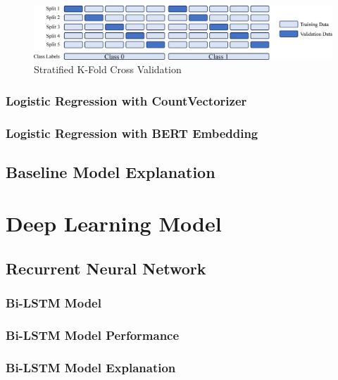 \documentclass[ %
                    author={Louis Wang},
                supervisor={Dr. Qiang Liu},
                    degree={MSc},
                     title={Identification of Suicide Ideation in Texts},
                      type={},
                      year={2024}]{dissertation}
\begin{document}
\begin{figure}[h]
      \centering
      \includegraphics[width=0.7\linewidth]{../img/cv.eps}
      \caption{Stratified K-Fold Cross Validation}
      \label{fig:cross validation}
\end{figure}

\subsection{Logistic Regression with CountVectorizer}

\subsection{Logistic Regression with BERT Embedding}

\section{Baseline Model Explanation}


\chapter{Deep Learning Model}
\label{chap:execution2}
\noindent

\section{Recurrent Neural Network}

\subsection{Bi-LSTM Model}

\subsection{Bi-LSTM Model Performance}

\subsection{Bi-LSTM Model Explanation}
\end{document}
